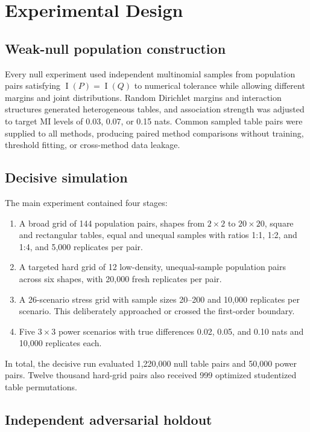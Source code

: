 \documentclass[10pt,twocolumn]{article}
\newcommand{\MI}{\operatorname{I}}
\begin{document}
\section{Experimental Design}

\subsection{Weak-null population construction}

Every null experiment used independent multinomial samples from population
pairs satisfying \(\MI(P)=\MI(Q)\) to numerical tolerance while allowing
different margins and joint distributions. Random Dirichlet margins and
interaction structures generated heterogeneous tables, and association
strength was adjusted to target MI levels of 0.03, 0.07, or 0.15 nats. Common
sampled table pairs were supplied to all methods, producing paired method
comparisons without training, threshold fitting, or cross-method data
leakage.

\subsection{Decisive simulation}

The main experiment contained four stages:
\begin{enumerate}[leftmargin=1.3em,itemsep=1pt,topsep=2pt]
  \item A broad grid of 144 population pairs, shapes from \(2\times2\) to
  \(20\times20\), square and rectangular tables, equal and unequal samples
  with ratios 1:1, 1:2, and 1:4, and 5,000 replicates per pair.
  \item A targeted hard grid of 12 low-density, unequal-sample population
  pairs across six shapes, with 20,000 fresh replicates per pair.
  \item A 26-scenario stress grid with sample sizes 20--200 and 10,000
  replicates per scenario. This deliberately approached or crossed the
  first-order boundary.
  \item Five \(3\times3\) power scenarios with true differences 0.02, 0.05,
  and 0.10 nats and 10,000 replicates each.
\end{enumerate}
In total, the decisive run evaluated 1,220,000 null table pairs and 50,000
power pairs. Twelve thousand hard-grid pairs also received 999 optimized
studentized table permutations.

\subsection{Independent adversarial holdout}
\end{document}

